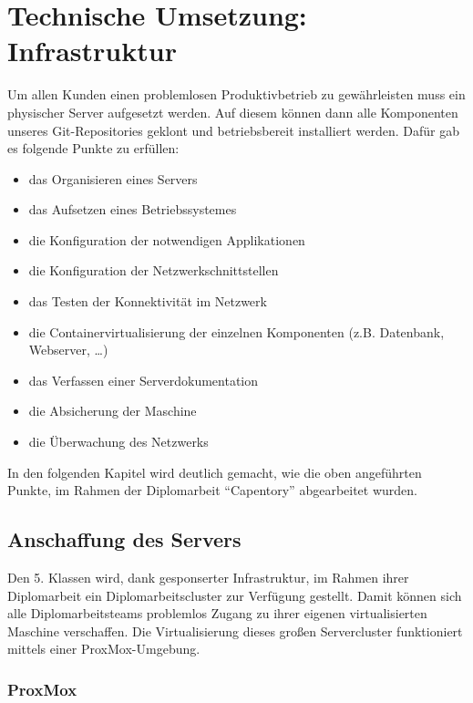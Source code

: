 \hypertarget{technische-umsetzung-infrastruktur}{%
\section{Technische Umsetzung:
Infrastruktur}\label{technische-umsetzung-infrastruktur}}

Um allen Kunden einen problemlosen Produktivbetrieb zu gewährleisten
muss ein physischer Server aufgesetzt werden. Auf diesem können dann
alle Komponenten unseres Git-Repositories geklont und betriebsbereit
installiert werden. Dafür gab es folgende Punkte zu erfüllen:

\begin{itemize}
\tightlist
\item
  das Organisieren eines Servers
\item
  das Aufsetzen eines Betriebssystemes
\item
  die Konfiguration der notwendigen Applikationen
\item
  die Konfiguration der Netzwerkschnittstellen
\item
  das Testen der Konnektivität im Netzwerk
\item
  die Containervirtualisierung der einzelnen Komponenten (z.B.
  Datenbank, Webserver, \ldots)
\item
  das Verfassen einer Serverdokumentation
\item
  die Absicherung der Maschine
\item
  die Überwachung des Netzwerks
\end{itemize}

In den folgenden Kapitel wird deutlich gemacht, wie die oben angeführten
Punkte, im Rahmen der Diplomarbeit ``Capentory'' abgearbeitet wurden.

\hypertarget{anschaffung-des-servers}{%
\subsection{Anschaffung des Servers}\label{anschaffung-des-servers}}

Den 5. Klassen wird, dank gesponserter Infrastruktur, im Rahmen ihrer
Diplomarbeit ein Diplomarbeitscluster zur Verfügung gestellt. Damit
können sich alle Diplomarbeitsteams problemlos Zugang zu ihrer eigenen
virtualisierten Maschine verschaffen. Die Virtualisierung dieses großen
Servercluster funktioniert mittels einer ProxMox-Umgebung.

\hypertarget{proxmox}{%
\subsubsection{ProxMox}\label{proxmox}}

